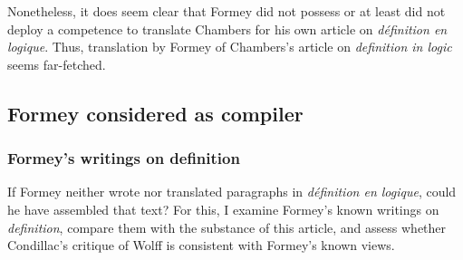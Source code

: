 \documentclass[output=paper]{langscibook}
\begin{document}
Nonetheless, it does seem clear that Formey did not possess or at least did not deploy a competence to translate Chambers for his own article on \emph{définition en logique}. Thus, translation by Formey of Chambers’s article on \emph{definition in logic} seems far-fetched.

\subsection{Formey considered as compiler}
\subsubsection{Formey’s writings on definition}

If Formey neither wrote nor translated paragraphs in \emph{définition en logique}, could he have assembled that text? For this, I examine Formey’s known writings on \emph{definition}, compare them with the substance of this article, and assess whether Condillac’s critique of Wolff is consistent with Formey’s known views.
\end{document}
